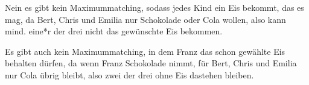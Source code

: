 \documentclass[11pt]{scrartcl}
\begin{document}
Nein es gibt kein Maximummatching, sodass jedes Kind ein Eis bekommt, das es mag, da Bert, Chris und Emilia nur Schokolade oder Cola wollen, also kann mind. eine*r der drei nicht das gewünschte Eis bekommen.

Es gibt auch kein Maximummatching, in dem Franz das schon gewählte Eis behalten dürfen, da wenn Franz Schokolade nimmt, für Bert, Chris und Emilia nur Cola übrig bleibt, also zwei der drei ohne Eis dastehen bleiben.
\end{document}
